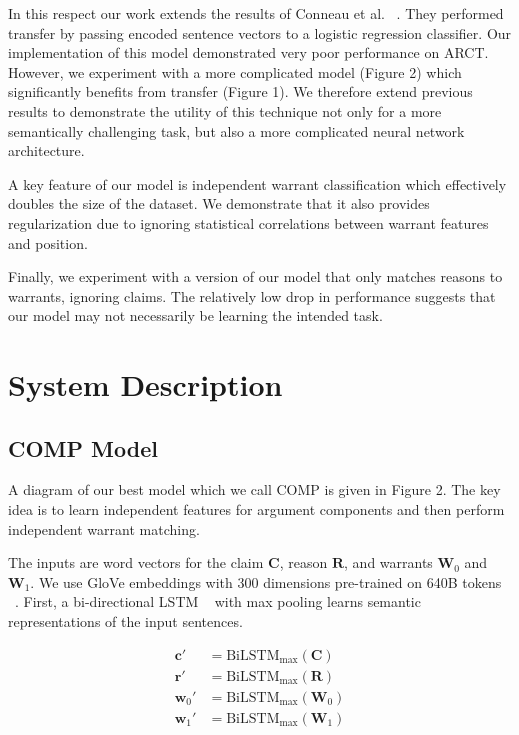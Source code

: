\documentclass[11pt,a4paper]{article}
\begin{document}
In this respect our work extends the results of Conneau et al. ~.
They performed transfer by passing encoded sentence vectors to a logistic regression classifier.
Our implementation of this model demonstrated very poor performance on ARCT.
However, we experiment with a more complicated model (Figure 2)  
  which significantly benefits from transfer (Figure 1).
We therefore extend previous results to demonstrate the utility of this technique
  not only for a more semantically challenging task,
  but also a more complicated neural network architecture.

A key feature of our model is independent warrant classification
  which effectively doubles the size of the dataset.
We demonstrate that it also provides regularization due to 
  ignoring statistical correlations between warrant features and position.

Finally, we experiment with a version of our model 
  that only matches reasons to warrants, ignoring claims.
The relatively low drop in performance suggests that our model may not necessarily be learning the intended task.

\section{System Description}

\subsection{COMP Model}

A diagram of our best model which we call COMP is given in Figure 2.
The key idea is to learn independent features for argument components
  and then perform independent warrant matching.

The inputs are word vectors for the claim $\mathbf{C}$, reason $\mathbf{R}$, and warrants $\mathbf{W}_0$ and $\mathbf{W}_1$.
We use GloVe embeddings with 300 dimensions pre-trained on 640B tokens ~\cite{pennington2014glove}.
First, a bi-directional LSTM ~\cite{hochreiter1997long} with max pooling learns semantic representations of the input sentences.

\setlength{\belowdisplayskip}{0pt} \setlength{\belowdisplayshortskip}{0pt}
\setlength{\abovedisplayskip}{0pt} \setlength{\abovedisplayshortskip}{0pt}

\begin{align*}
\mathbf{c}' &= \text{BiLSTM}_{\max}(\mathbf{C})  \\
\mathbf{r}' &= \text{BiLSTM}_{\max}(\mathbf{R}) \\
\mathbf{w}_0' &= \text{BiLSTM}_{\max}(\mathbf{W}_0) \\
\mathbf{w}_1' &= \text{BiLSTM}_{\max}(\mathbf{W}_1) \\
\end{align*}
\end{document}
